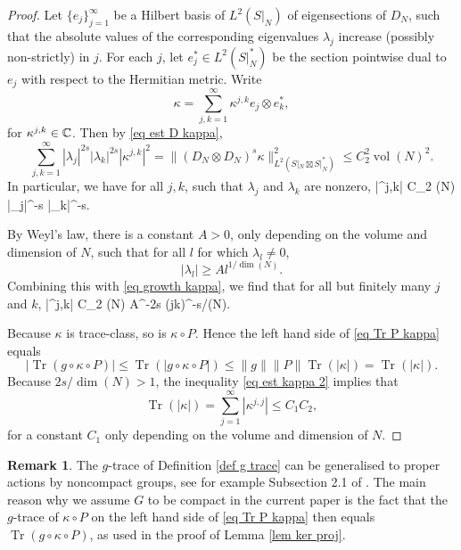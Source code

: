 \documentclass[11pt]{article}
\theoremstyle{plain}
\theoremstyle{definition}
\newtheorem{remark}[theorem]{Remark}
\theoremstyle{remark}
\numberwithin{equation}{section}
\DeclareMathOperator{\Tr}{Tr}
\DeclareMathOperator{\vol}{vol}
\begin{document}
\begin{proof}
Let $\{e_j\}_{j=1}^{\infty}$ be a Hilbert basis of $L^2(S|_N)$ of eigensections of $D_N$, such that the absolute values of the corresponding eigenvalues $\lambda_j$ increase  (possibly non-strictly) in $j$.
For each $j$, let $e_j^* \in L^2(S|_N^*)$ be the section pointwise dual to $e_j$ with respect to the Hermitian metric.
Write
\[
\kappa = \sum_{j,k=1}^{\infty} \kappa^{j, k} e_j \otimes e_k^*,
\]
for $\kappa^{j,k} \in \mathbb{C}$. Then by \eqref{eq est D kappa},
\[
\sum_{j,k = 1}^{\infty} |\lambda_j|^{2s} |\lambda_k|^{2s} |\kappa^{j,k}|^{2}
	= \|(D_N \otimes D_N)^s \kappa\|_{L^2(S|_N \boxtimes S|_N^*)}^2
	\leq C_2^2 \vol(N)^2.
\]
In particular, we have for all $j,k$, such that $\lambda_j$ and $\lambda_k$ are nonzero,
|\kappa^{j,k}| \leq C_2 \vol(N)  |\lambda_j|^{-s} |\lambda_k|^{-s}.
\eeq


By Weyl's law, there is a constant $A>0$, only depending on the volume and dimension of $N$,  such that for all $l$ for which $\lambda_{l} \not=0$,
\[
|\lambda_l| \geq A l^{1/\dim(N)}.
%
\]
Combining this with \eqref{eq growth kappa}, we find that for all but finitely many $j$ and $k$,
|\kappa^{j,k}| \leq C_2 \vol(N) A^{-2s} (jk)^{-s/\dim(N)}. %
\eeq


Because $\kappa$ is trace-class, so is
 $ \kappa \circ P$. Hence the left hand side of \eqref{eq Tr P kappa} equals
\[
|\Tr(g\circ \kappa \circ P)| \leq \Tr(|g\circ \kappa \circ P|) \leq  \|g\| \|P\|\Tr(|\kappa|) = \Tr(|\kappa|).
\]
Because $2s/\dim(N)>1$, the inequality \eqref{eq est kappa 2} implies that
\[
\Tr(|\kappa|) =
\sum_{j=1}^{\infty} |\kappa^{j,j}| \leq C_1C_2,
\]
for a constant $C_1$ only depending on the volume and dimension of $N$.
\end{proof}

\begin{remark}
The $g$-trace of Definition \ref{def g trace} can be generalised to proper actions by noncompact groups, see for example Subsection 2.1 of \cite{HWW}. The main reason why we assume $G$ to be compact in the current paper is the fact that the $g$-trace of $\kappa \circ P$ on the left hand side of \eqref{eq Tr P kappa} then equals $\Tr(g \circ \kappa \circ P)$, as used in the proof of Lemma \ref{lem ker proj}.
\end{remark}
\end{document}
